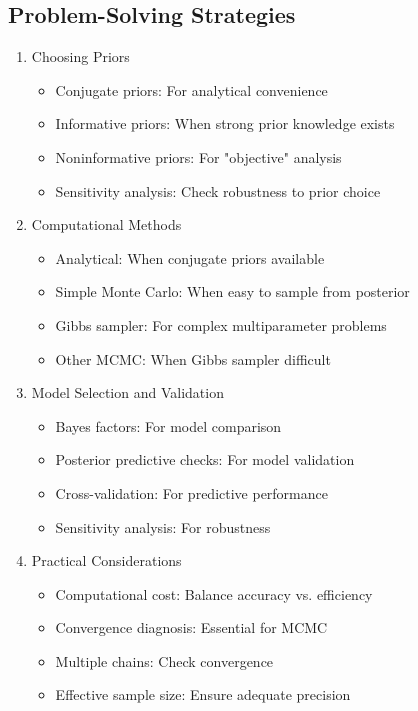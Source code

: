 \subsection{Problem-Solving Strategies}

\begin{enumerate}
	\item Choosing Priors
	\begin{itemize}
		\item Conjugate priors: For analytical convenience
		\item Informative priors: When strong prior knowledge exists
		\item Noninformative priors: For "objective" analysis
		\item Sensitivity analysis: Check robustness to prior choice
	\end{itemize}
	\item Computational Methods
	\begin{itemize}
		\item Analytical: When conjugate priors available
		\item Simple Monte Carlo: When easy to sample from posterior
		\item Gibbs sampler: For complex multiparameter problems
		\item Other MCMC: When Gibbs sampler difficult
	\end{itemize}
	\item Model Selection and Validation
	\begin{itemize}
		\item Bayes factors: For model comparison
		\item Posterior predictive checks: For model validation
		\item Cross-validation: For predictive performance
		\item Sensitivity analysis: For robustness
	\end{itemize}
	\item Practical Considerations
	\begin{itemize}
		\item Computational cost: Balance accuracy vs. efficiency
		\item Convergence diagnosis: Essential for MCMC
		\item Multiple chains: Check convergence
		\item Effective sample size: Ensure adequate precision
	\end{itemize}
\end{enumerate}

